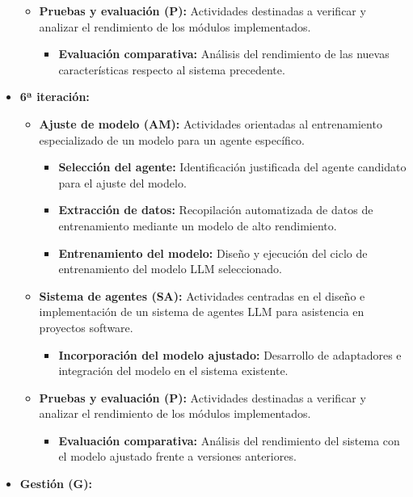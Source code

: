 \begin{itemize}
\begin{itemize}
\begin{itemize}
        \end{itemize}
      \item\textbf{Pruebas y evaluación (P):} Actividades destinadas a verificar y analizar el rendimiento de los módulos implementados.
        \begin{itemize}
          \item\textbf{Evaluación comparativa: } Análisis del rendimiento de las nuevas características respecto al sistema precedente.
        \end{itemize}
    \end{itemize}
  \item\textbf{6ª iteración:}
    \begin{itemize}
      \item\textbf{Ajuste de modelo (AM):} Actividades orientadas al entrenamiento especializado de un modelo para un agente específico.
      \begin{itemize}
        \item\textbf{Selección del agente:} Identificación justificada del agente candidato para el ajuste del modelo.
        \item\textbf{Extracción de datos:} Recopilación automatizada de datos de entrenamiento mediante un modelo de alto rendimiento.
        \item\textbf{Entrenamiento del modelo:} Diseño y ejecución del ciclo de entrenamiento del modelo LLM seleccionado.
      \end{itemize}
      \item\textbf{Sistema de agentes (SA):} Actividades centradas en el diseño e implementación de un sistema de agentes LLM para asistencia en proyectos software.
        \begin{itemize}
          \item\textbf{Incorporación del modelo ajustado:} Desarrollo de adaptadores e integración del modelo en el sistema existente.
        \end{itemize}
      \item\textbf{Pruebas y evaluación (P):} Actividades destinadas a verificar y analizar el rendimiento de los módulos implementados.
        \begin{itemize}
          \item\textbf{Evaluación comparativa: } Análisis del rendimiento del sistema con el modelo ajustado frente a versiones anteriores.
        \end{itemize}
    \end{itemize}
  \item\textbf{Gestión (G):} 

\end{itemize}
